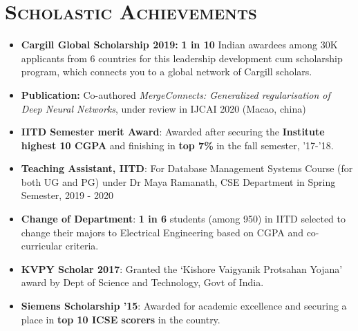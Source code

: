 \documentclass{article}
\newcommand{\tmpsection}[1]{}
\let\tmpsection=\section
\renewcommand{\section}[1]{\tmpsection*{\textsc{#1}}}
\begin{document}
\section{Scholastic Achievements}
\begin{itemize}
    \setlength\itemsep{0.0em}
    
    \item \textbf{Cargill Global Scholarship 2019:} \textbf{1 in 10} Indian awardees among 30K applicants from 6 countries for this leadership development cum scholarship program, which connects you to a global network of Cargill scholars.
    
    \item \textbf{Publication:} Co-authored \textit{MergeConnects: Generalized regularisation of Deep Neural Networks}, under review in IJCAI 2020 (Macao, china)
 
    \item \textbf{IITD Semester merit Award}: Awarded after securing the \textbf{Institute highest 10 CGPA} and finishing in \textbf{top 7\%} in the fall semester, '17-'18.
     
    \item \textbf{Teaching Assistant, IITD}: For Database Management Systems Course (for both UG and PG)  under Dr Maya Ramanath, CSE Department in Spring Semester, 2019 - 2020
    
    
   \item \textbf{Change of Department}: \textbf{1 in 6} students (among 950) in IITD selected to change their majors to Electrical Engineering based on CGPA and co-curricular criteria. 
   
    \item \textbf{KVPY Scholar 2017}: Granted the `Kishore Vaigyanik Protsahan Yojana' award by Dept of Science and Technology, Govt of India.

    \item \textbf{Siemens Scholarship '15}: Awarded for academic excellence and securing a place in \textbf{top 10 ICSE scorers} in the country.
    
   
    
    
\end{itemize}
\end{document}
